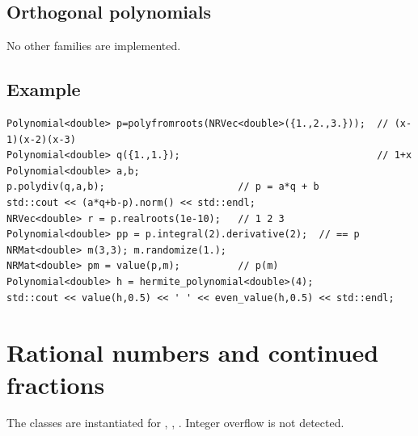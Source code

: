 \subsection{Orthogonal polynomials}
\begin{lareference}
\end{lareference}
No other families are implemented.

\subsection{Example}
\begin{lstlisting}
Polynomial<double> p=polyfromroots(NRVec<double>({1.,2.,3.}));  // (x-1)(x-2)(x-3)
Polynomial<double> q({1.,1.});                                  // 1+x
Polynomial<double> a,b;
p.polydiv(q,a,b);                       // p = a*q + b
std::cout << (a*q+b-p).norm() << std::endl;
NRVec<double> r = p.realroots(1e-10);   // 1 2 3
Polynomial<double> pp = p.integral(2).derivative(2);  // == p
NRMat<double> m(3,3); m.randomize(1.);
NRMat<double> pm = value(p,m);          // p(m)
Polynomial<double> h = hermite_polynomial<double>(4);
std::cout << value(h,0.5) << ' ' << even_value(h,0.5) << std::endl;
\end{lstlisting}

\section{Rational numbers and continued fractions}\label{sec:polynomial:contfrac}

The classes are instantiated for , , . Integer overflow is not detected.

